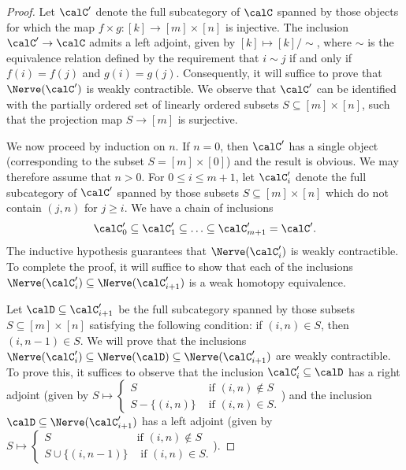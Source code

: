 \begin{proof}
Let $\calC'$ denote the full subcategory of $\calC$ spanned by those objects for which
the map $f \times g: [k] \rightarrow [m] \times [n]$ is injective. The inclusion
$\calC' \rightarrow \calC$ admits a left adjoint, given by $[k] \mapsto [k]/ \sim$, where
$\sim$ is the equivalence relation defined by the requirement that $i \sim j$ if and only if
$f(i) = f(j)$ and $g(i) = g(j)$. Consequently, it will suffice to prove that $\Nerve(\calC')$ is weakly contractible. We observe that $\calC'$ can be identified with the partially ordered set of
linearly ordered subsets $S \subseteq [m] \times [n]$, such that the projection map
$S \rightarrow [m]$ is surjective.

We now proceed by induction on $n$. If $n = 0$, then $\calC'$ has a single object
(corresponding to the subset $S = [m] \times [0]$) and the result is obvious. We may therefore assume that $n > 0$. For $0 \leq i \leq m+1$, let $\calC'_{i}$ denote the full subcategory of
$\calC'$ spanned by those subsets $S \subseteq [m] \times [n]$ which do not contain
$(j, n)$ for $j \geq i$. We have a chain of inclusions
$$ \calC'_0 \subseteq \calC'_{1} \subseteq \ldots \subseteq \calC'_{m+1} = \calC'.$$
The inductive hypothesis guarantees that $\Nerve(\calC'_{i})$ is weakly contractible.
To complete the proof, it will suffice to show that each of the inclusions
$\Nerve(\calC'_{i}) \subseteq \Nerve( \calC'_{i+1})$ is a weak homotopy equivalence.

Let $\calD \subseteq \calC'_{i+1}$ be the full subcategory spanned by those
subsets $S \subseteq [m] \times [n]$ satisfying the following condition:
if $(i,n) \in S$, then $(i, n-1) \in S$. We will prove that the inclusions
$\Nerve( \calC'_{i}) \subseteq \Nerve(\calD) \subseteq \Nerve(\calC'_{i+1})$ are weakly contractible.
To prove this, it suffices to observe that the inclusion $\calC'_{i} \subseteq \calD$ has a right
adjoint (given by $S \mapsto \begin{cases} S & \text{ if } (i,n) \notin S \\
S - \{ (i,n) \} & \text{ if } (i,n) \in S. \end{cases}$)
and the inclusion $\calD \subseteq \Nerve( \calC'_{i+1})$ has a left adjoint
(given by $S \mapsto \begin{cases} S & \text{if } (i,n) \notin S \\
S \cup \{ (i,n-1) \} & \text{ if } (i,n) \in S. \end{cases}$). 
\end{proof}

